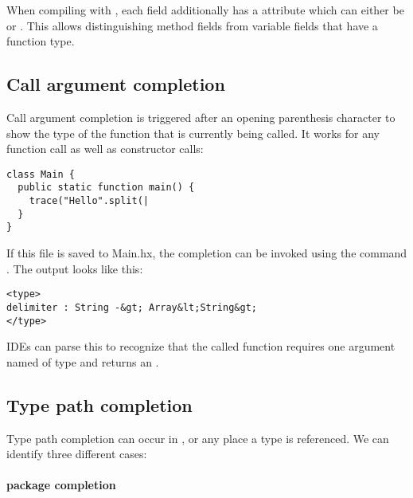 
When compiling with , each field additionally has a  attribute which can either be  or . This allows distinguishing method fields from variable fields that have a function type.



\subsection{Call argument completion}
\label{cr-completion-call-argument}

Call argument completion is triggered after an opening parenthesis character \ic{(} to show the type of the function that is currently being called. It works for any function call as well as constructor calls:

\begin{lstlisting}
class Main {
  public static function main() {
    trace("Hello".split(|
  }
}
\end{lstlisting}

If this file is saved to Main.hx, the completion can be invoked using the command . The output looks like this:

\begin{lstlisting}
<type>
delimiter : String -&gt; Array&lt;String&gt;
</type>
\end{lstlisting}

IDEs can parse this to recognize that the called function requires one argument named  of type  and returns an .


\subsection{Type path completion}
\label{cr-completion-type-path}

Type path completion can occur in ,  or any place a type is referenced. We can identify three different cases:

\paragraph{package completion}

